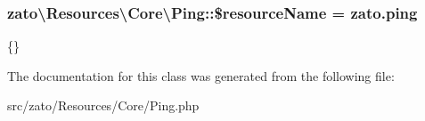 \subsubsection[{\$resource\+Name}]{\setlength{\rightskip}{0pt plus 5cm}zato\textbackslash{}\+Resources\textbackslash{}\+Core\textbackslash{}\+Ping\+::\$resource\+Name = \textquotesingle{}zato.\+ping\textquotesingle{}\hspace{0.3cm}{\ttfamily [protected]}}\label{classzato_1_1_resources_1_1_core_1_1_ping_ae43661c6c12c8b762537bbda5e7e2c1e}
\{\} 

The documentation for this class was generated from the following file\+:\begin{DoxyCompactItemize}
\item 
src/zato/\+Resources/\+Core/Ping.\+php\end{DoxyCompactItemize}
